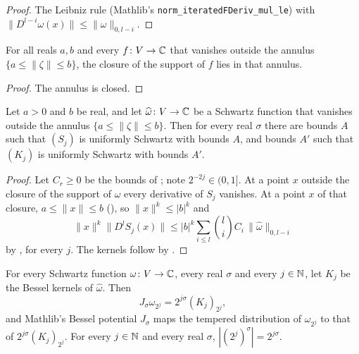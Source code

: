 \begin{proof}
\leanok
The Leibniz rule (Mathlib's
\texttt{norm\_\allowbreak iteratedFDeriv\_\allowbreak mul\_\allowbreak le}) with
$\|D^{l-i} \omega(x)\| \leq \|\omega\|_{0,l-i}$.
\end{proof}

\begin{lemma}
\label{lem:tsupport-annulus}
\leanok
For all reals $a, b$ and every $f \colon V \to \mathbb{C}$ that vanishes outside the annulus
$\{a \leq \|\zeta\| \leq b\}$, the closure of the support of $f$ lies in that annulus.
\end{lemma}

\begin{proof}
\leanok
The annulus is closed.
\end{proof}

\begin{theorem}
\label{thm:bessel-kernels-uniform}
\leanok
{}
Let $a > 0$ and $b$ be real, and let $\widehat\omega \colon V \to \mathbb{C}$ be a Schwartz function
that vanishes outside the annulus $\{a \leq \|\zeta\| \leq b\}$. Then for every real $\sigma$
there are bounds $A$ such that $(S_j)$ is uniformly Schwartz with bounds $A$, and bounds $A'$
such that $(K_j)$ is uniformly Schwartz with bounds $A'$.
\end{theorem}

\begin{proof}
\leanok
Let $C_r \geq 0$ be the bounds of ; note
$2^{-2j} \in (0, 1]$. At a point $x$ outside the closure of the support of $\widehat\omega$
every derivative of $S_j$ vanishes. At a point $x$ of that closure, $a \leq \|x\| \leq b$
(), so $\|x\|^k \leq |b|^k$ and
\[
  \|x\|^k \|D^l S_j(x)\| \leq |b|^k \sum_{i \leq l} \binom{l}{i} C_i \,
  \|\widehat\omega\|_{0,l-i}
\]
by , for every $j$. The kernels follow by
.
\end{proof}

\begin{theorem}
\label{thm:bessel-potential-dilate}
\leanok
{}
For every Schwartz function $\omega \colon V \to \mathbb{C}$, every real $\sigma$ and every $j \in \mathbb{N}$,
let $K_j$ be the Bessel kernels of $\widehat\omega$. Then
\[
  J_\sigma \omega_{2^j} = 2^{j\sigma} (K_j)_{2^j} ,
\]
and Mathlib's Bessel potential $J_\sigma$ maps the tempered distribution of $\omega_{2^j}$ to
that of $2^{j\sigma} (K_j)_{2^j}$. For every $j \in \mathbb{N}$ and every real $\sigma$,
$|(2^j)^\sigma| = 2^{j\sigma}$.
\end{theorem}

